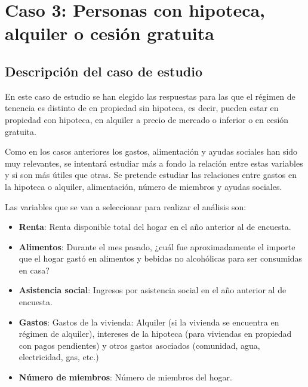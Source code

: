 
\chapter{Caso 3: Personas con hipoteca, alquiler o cesión gratuita}

\section{Descripción del caso de estudio}
En este caso de estudio se han elegido las respuestas para las que el régimen de tenencia es distinto de en propiedad sin hipoteca, es decir, pueden estar en propiedad con hipoteca, en alquiler a precio de mercado o inferior o en cesión gratuita.

Como en los casos anteriores los gastos, alimentación y ayudas sociales han sido muy relevantes, se intentará estudiar más a fondo la relación entre estas variables y si son más útiles que otras. Se pretende estudiar las relaciones entre gastos en la hipoteca o alquiler, alimentación, número de miembros y ayudas sociales.

Las variables que se van a seleccionar para realizar el análisis son:
\begin{itemize}
\item \textbf{Renta}: Renta disponible total del hogar en el año anterior al de encuesta.
\item \textbf{Alimentos}: Durante el mes pasado, ¿cuál fue aproximadamente el importe que el hogar gastó en alimentos y bebidas no alcohólicas para ser consumidas en casa?
\item \textbf{Asistencia social}: Ingresos por asistencia social en el año anterior al
de encuesta.
\item \textbf{Gastos}: Gastos de la vivienda: Alquiler (si la vivienda se encuentra en régimen de alquiler), intereses de la hipoteca (para viviendas en propiedad con pagos pendientes) y otros gastos asociados (comunidad, agua, electricidad, gas, etc.)
\item \textbf{Número de miembros}: Número de miembros del hogar.
\end{itemize}

